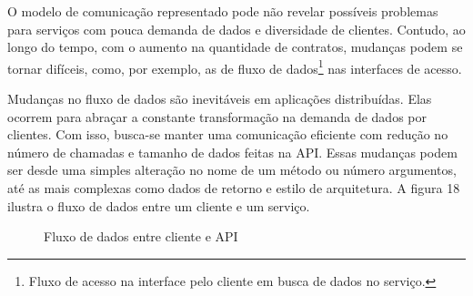 O modelo de comunicação representado pode não revelar possíveis problemas para serviços com pouca demanda de dados e diversidade de clientes. Contudo, ao longo do tempo, com o aumento na quantidade de contratos, mudanças podem se tornar difíceis, como, por exemplo, as de fluxo de dados\footnote{
  Fluxo de acesso na interface pelo cliente em busca de dados no serviço.
} nas interfaces de acesso.

Mudanças no fluxo de dados são inevitáveis em aplicações distribuídas. Elas ocorrem para abraçar a constante transformação na demanda de dados por clientes. Com isso, busca-se manter uma comunicação eficiente com redução no número de chamadas e tamanho de dados feitas na API. Essas mudanças podem ser desde uma simples alteração no nome de um método ou número argumentos, até as mais complexas como dados de retorno e estilo de arquitetura. A figura 18 ilustra o fluxo de dados entre um cliente e um serviço.

\begin{figure}[H]
  \centering
  \caption{Fluxo de dados entre cliente e API}
\end{figure}

